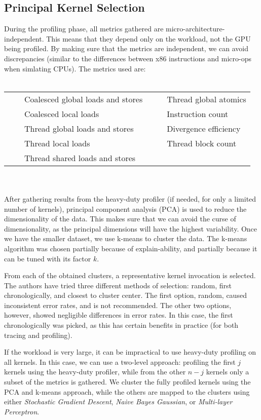 \subsection{Principal Kernel Selection}\label{subsec:pks}
During the profiling phase, all metrics gathered are micro-architecture-independent.
This means that they depend only on the workload, not the GPU being profiled.
By making sure that the metrics are independent, we can avoid discrepancies (similar to the differences between x86 instructions and micro-ops when simlating CPUs).
The metrics used are:
\\
\\
\newcommand{\tabitem}{~~\textbullet~~}
\begin{tabular}{p{}p{}}
    \tabitem Coalesced global loads and stores & \tabitem Thread global atomics \\
    \tabitem Coalesced local loads             & \tabitem Instruction count     \\
    \tabitem Thread global loads and stores    & \tabitem Divergence efficiency \\
    \tabitem Thread local loads                & \tabitem Thread block count    \\
    \tabitem Thread shared loads and stores
\end{tabular}
\\
\\
After gathering results from the heavy-duty profiler (if needed, for only a limited number of kernels), principal component analysis (PCA) is used to reduce the dimensionality of the data.
This makes sure that we can avoid the curse of dimensionality, as the principal dimensions will have the highest variability.
Once we have the smaller dataset, we use k-means to cluster the data.
The k-means algorithm was chosen partially because of explain-ability, and partially because it can be tuned with its factor $k$.

From each of the obtained clusters, a representative kernel invocation is selected.
The authors have tried three different methods of selection: random, first chronologically, and closest to cluster center.
The first option, random, caused inconsistent error rates, and is not recommended.
The other two options, however, showed negligible differences in error rates.
In this case, the first chronologically was picked, as this has certain benefits in practice (for both tracing and profiling).

If the workload is very large, it can be impractical to use heavy-duty profiling on all kernels.
In this case, we can use a two-level approach: profiling the first $j$ kernels using the heavy-duty profiler, while from the other $n - j$ kernels only a subset of the metrics is gathered.
We cluster the fully profiled kernels using the PCA and k-means approach, while the others are mapped to the clusters using either \textit{Stochastic Gradient Descent}, \textit{Naive Bayes Gaussian}, or \textit{Multi-layer Perceptron}.

